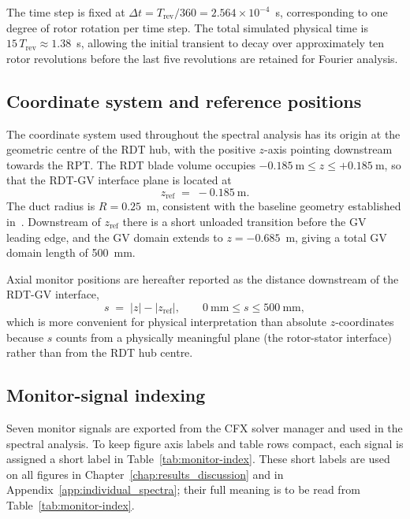 The time step is fixed at $\Delta t = T_{\mathrm{rev}}/360 = 2.564\times 10^{-4}$~s, corresponding to one degree of rotor rotation per time step. The total simulated physical time is $15\,T_{\mathrm{rev}} \approx 1.38$~s, allowing the initial transient to decay over approximately ten rotor revolutions before the last five revolutions are retained for Fourier analysis.
 
\subsection{Coordinate system and reference positions}
\label{sec:coord-system}
 
The coordinate system used throughout the spectral analysis has its origin at the geometric centre of the RDT hub, with the positive $z$-axis pointing downstream towards the RPT. The RDT blade volume occupies $-0.185~\mathrm{m} \leq z \leq +0.185~\mathrm{m}$, so that the RDT-GV interface plane is located at
\begin{equation}
    z_{\mathrm{ref}} \;=\; -0.185~\mathrm{m}. \label{eq:zref}
\end{equation}
The duct radius is $R = 0.25$~m, consistent with the baseline geometry established in~\cite{Leonsen2025}. Downstream of $z_{\mathrm{ref}}$ there is a short unloaded transition before the GV leading edge, and the GV domain extends to $z = -0.685$~m, giving a total GV domain length of 500~mm.
 
Axial monitor positions are hereafter reported as the distance downstream of the RDT-GV interface,
\begin{equation}
    s \;=\; |z| - |z_{\mathrm{ref}}|,
    \qquad 0~\mathrm{mm} \leq s \leq 500~\mathrm{mm},
\end{equation}
which is more convenient for physical interpretation than absolute $z$-coordinates because $s$ counts from a physically meaningful plane (the rotor-stator interface) rather than from the RDT hub centre.
 
\subsection{Monitor-signal indexing}
\label{sec:monitor-index}
 
Seven monitor signals are exported from the CFX solver manager and used in the spectral analysis. To keep figure axis labels and table rows compact, each signal is assigned a short label in Table~\ref{tab:monitor-index}. These short labels are used on all figures in Chapter~\ref{chap:results_discussion} and in Appendix~\ref{app:individual_spectra}; their full meaning is to be read from Table~\ref{tab:monitor-index}.
 
